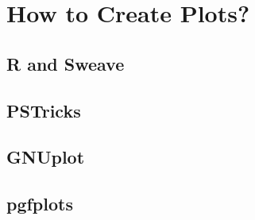 \section{How to Create Plots?}

\subsection{R and Sweave}

\subsection{PSTricks}

\subsection{GNUplot}

\subsection{pgfplots}
